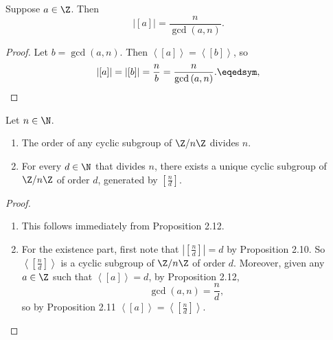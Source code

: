 \documentclass[pmath347]{subfiles}
\begin{document}
    \begin{prop}{}
        Suppose $a\in\Z$. Then
        \begin{equation*}
            \left| \left[ a \right]  \right| = \frac{n}{\gcd\left( a,n \right) }. 
        \end{equation*}
    \end{prop}

    \begin{proof}
        Let $b=\gcd\left( a,n \right)$. Then $\left< \left[ a \right]  \right> = \left< \left[ b \right]  \right> $, so
        \begin{equation*}
            \left| \left[ a \right]  \right| = \left| \left[ b \right]   \right| = \frac{n}{b} = \frac{n}{\gcd\left( a,n \right) }. \eqedsym,
        \end{equation*}
    \end{proof}

    \begin{cor}{}
        Let $n\in\N$. 
        \begin{enumerate}
            \item The order of any cyclic subgroup of $\Z /n\Z$ divides $n$.
            \item For every $d\in\N$ that divides $n$, there exists a unique cyclic subgroup of $\Z /n\Z$ of order $d$, generated by $\left[ \frac{n}{d} \right]$.
        \end{enumerate}
    \end{cor}	

    \begin{proof}
        \begin{enumerate}
            \item This follows immediately from Proposition 2.12. \qqqedsym
            \item For the existence part, first note that $\left| \left[ \frac{n}{d} \right]  \right| = d$ by Proposition 2.10. So $\left< \left[ \frac{n}{d} \right]  \right>$ is a cyclic subgroup of $\Z /n\Z$ of order $d$. Moreover, given any $a\in\Z$ such that $\left< \left[ a \right]  \right> = d$, by Proposition 2.12,
                \begin{equation*}
                    \gcd\left( a,n \right) = \frac{n}{d},
                \end{equation*}
                so by Proposition 2.11 $\left< \left[ a \right]  \right> = \left< \left[ \frac{n}{d} \right]  \right>$. \qqedsym  
        \end{enumerate}
    \end{proof}
    
\end{document}
